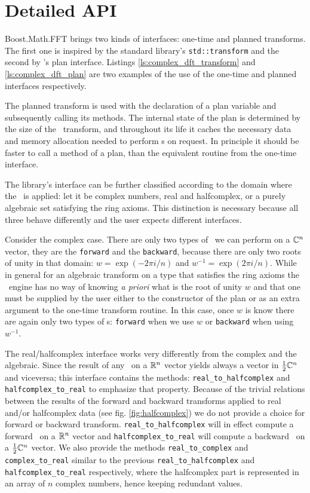 \section{Detailed API}
Boost.Math.FFT brings two kinds of interfaces: one-time and planned transforms.
The first one is inspired by the standard library's \texttt{std::transform} 
and the second by \fftw's plan interface. Listings
\ref{ls:complex_dft_transform} and \ref{ls:complex_dft_plan} are two examples of
the use of the one-time and planned interfaces respectively.

The planned transform is used with
the declaration of a plan variable and subsequently calling its methods.
The internal state of the plan is determined by the size of the \dft\ transform,
and throughout its life it caches the necessary data and memory allocation
needed to perform \dft s on request. In principle it should be faster to call a
method of a plan, than the equivalent routine from the one-time interface.

The library's interface can be further classified according to the domain where
the \dft\ is applied: let it be complex numbers, real and halfcomplex, or a
purely algebraic set satisfying the ring axioms. This distinction is necessary
because all three behave differently and the user expects different interfaces.

Consider the complex case. There are only two types of \dft\ we can perform on
a $\mathbb{C}^n$ vector, they are the \verb|forward| and the \verb|backward|, 
because there are only two roots of unity in that domain:
$w = \exp( - 2 \pi i/n)$ 
and
$w^{-1} = \exp( 2 \pi i/n)$.
While in general for an algebraic transform on a type that satisfies the ring
axioms the \dft\ engine has no way of knowing \emph{a priori} what is the root
of unity $w$ and that one must be supplied by the user either to the constructor
of the plan or as an extra argument to the one-time transform routine. In this
case, once $w$ is know there are again only two types of \dft s: \verb|forward| 
when we use $w$ or \verb|backward| when using $w^{-1}$.

The real/halfcomplex interface works very differently from the complex and the
algebraic. Since the result of any \dft\ on a $\mathbb{R}^n$ vector yields always a
vector in $\frac{1}{2}\mathbb{C}^n$ and viceversa; this interface contains the methods:
\verb|real_to_halfcomplex| and \verb|halfcomplex_to_real| to emphasize that
property. Because of the trivial relations between the results of the forward
and backward transforms applied to real and/or halfcomplex data (see fig.
\ref{fig:halfcomplex}) we do not provide a choice for forward or backward
transform. \verb|real_to_halfcomplex| will in effect compute a forward \dft\ on
a $\mathbb{R}^n$ vector and \verb|halfcomplex_to_real| will compute a backward \dft\ on a
$\frac{1}{2}\mathbb{C}^n$ vector. We also provide the methods \verb|real_to_complex|
and \verb|complex_to_real| similar to the previous \verb|real_to_halfcomplex|
and \verb|halfcomplex_to_real| respectively, where the halfcomplex part is
represented in an array of $n$ complex numbers, hence keeping redundant values.

